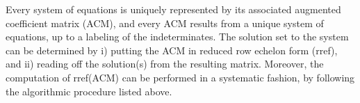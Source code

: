\documentclass[handout]{ximera}
\numberwithin{equation}{section}
\begin{document}
\begin{theorem} Every system of equations is uniquely represented by its associated augmented coefficient matrix (ACM), and every ACM results from a unique system of equations, up to a labeling of the indeterminates. The solution set to the system can be determined by i) putting the ACM in reduced row echelon form (rref), and ii) reading off the solution(s) from the resulting matrix. Moreover, the computation of rref(ACM) can be performed in a systematic fashion, by following the algorithmic procedure listed above.
\end{theorem}

\end{document}
